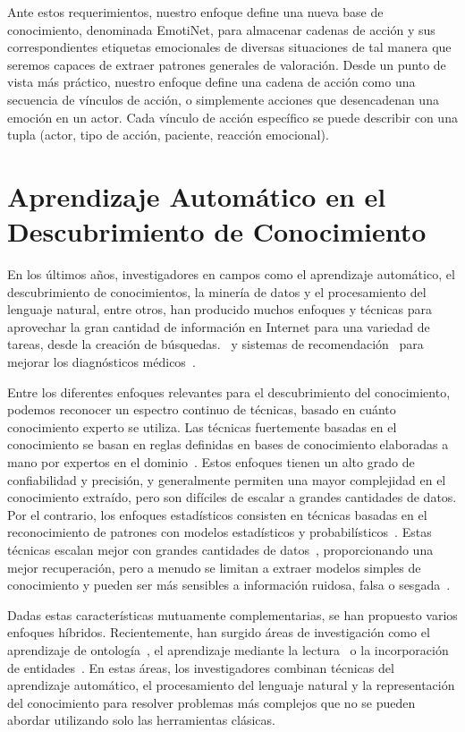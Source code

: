 Ante estos requerimientos, nuestro enfoque define una nueva base de conocimiento, denominada EmotiNet, para almacenar cadenas de acción y sus correspondientes etiquetas emocionales de diversas situaciones de tal manera que seremos capaces de extraer patrones generales de valoración. Desde un punto de vista más práctico, nuestro enfoque define una cadena de acción como una secuencia de vínculos de acción, o simplemente acciones que desencadenan una emoción en un actor. Cada vínculo de acción específico se puede describir con una tupla (actor, tipo de acción, paciente, reacción emocional).

\section{Aprendizaje Automático en el Descubrimiento de Conocimiento}\label{sec:sota-ml}

En los últimos años, investigadores en campos como el aprendizaje automático, el descubrimiento de conocimientos, la minería de datos y el procesamiento del lenguaje natural, entre otros, han producido muchos enfoques y técnicas para aprovechar la gran cantidad de información en Internet para una variedad de tareas, desde la creación de búsquedas.~\cite{google} y sistemas de recomendación~\cite{youtube} para mejorar los diagnósticos médicos~\cite{watson}.

Entre los diferentes enfoques relevantes para el descubrimiento del conocimiento, podemos reconocer un espectro continuo de técnicas, basado en cuánto conocimiento experto se utiliza. Las técnicas fuertemente basadas en el conocimiento se basan en reglas definidas en bases de conocimiento elaboradas a mano por expertos en el dominio~\cite{chandrasekaran1986generic}. Estos enfoques tienen un alto grado de confiabilidad y precisión, y generalmente permiten una mayor complejidad en el conocimiento extraído, pero son difíciles de escalar a grandes cantidades de datos. Por el contrario, los enfoques estadísticos consisten en técnicas basadas en el reconocimiento de patrones con modelos estadísticos y probabilísticos~\cite{kevin2012machine}. Estas técnicas escalan mejor con grandes cantidades de datos~\cite{le2013building}, proporcionando una mejor recuperación, pero a menudo se limitan a extraer modelos simples de conocimiento y pueden ser más sensibles a información ruidosa, falsa o sesgada~\cite{bolukbasi2016man}.

Dadas estas características mutuamente complementarias, se han propuesto varios enfoques híbridos. Recientemente, han surgido áreas de investigación como el aprendizaje de ontología~\cite{cimiano2009ontology}, el aprendizaje mediante la lectura~\cite{barker2007learning} o la incorporación de entidades~\cite{hu2015entity}.
En estas áreas, los investigadores combinan técnicas del aprendizaje automático, el procesamiento del lenguaje natural y la representación del conocimiento para resolver problemas más complejos que no se pueden abordar utilizando solo las herramientas clásicas.

